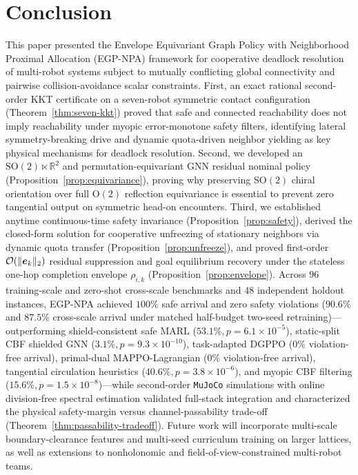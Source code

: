 \section{Conclusion}\label{sec:conclusion}

This paper presented the Envelope Equivariant Graph Policy with Neighborhood Proximal Allocation (EGP-NPA) framework for cooperative deadlock resolution of multi-robot systems subject to mutually conflicting global connectivity and pairwise collision-avoidance scalar constraints. First, an exact rational second-order KKT certificate on a seven-robot symmetric contact configuration (Theorem~\ref{thm:seven-kkt}) proved that safe and connected reachability does not imply reachability under myopic error-monotone safety filters, identifying lateral symmetry-breaking drive and dynamic quota-driven neighbor yielding as key physical mechanisms for deadlock resolution. Second, we developed an $\mathrm{SO}(2)\ltimes\mathbb R^2$ and permutation-equivariant GNN residual nominal policy (Proposition~\ref{prop:equivariance}), proving why preserving $\mathrm{SO}(2)$ chiral orientation over full $\mathrm{O}(2)$ reflection equivariance is essential to prevent zero tangential output on symmetric head-on encounters. Third, we established anytime continuous-time safety invariance (Proposition~\ref{prop:safety}), derived the closed-form solution for cooperative unfreezing of stationary neighbors via dynamic quota transfer (Proposition~\ref{prop:unfreeze}), and proved first-order $\mathcal O(\lVert\boldsymbol{e}_k\rVert_2)$ residual suppression and goal equilibrium recovery under the stateless one-hop completion envelope $\rho_{i,k}$ (Proposition~\ref{prop:envelope}). Across $96$ training-scale and zero-shot cross-scale benchmarks and $48$ independent holdout instances, EGP-NPA achieved $100\%$ safe arrival and zero safety violations ($90.6\%$ and $87.5\%$ cross-scale arrival under matched half-budget two-seed retraining)—outperforming shield-consistent safe MARL ($53.1\%,p=6.1\times 10^{-5}$), static-split CBF shielded GNN ($3.1\%,p=9.3\times 10^{-10}$), task-adapted DGPPO ($0\%$ violation-free arrival), primal-dual MAPPO-Lagrangian ($0\%$ violation-free arrival), tangential circulation heuristics ($40.6\%,p=3.8\times 10^{-6}$), and myopic CBF filtering ($15.6\%,p=1.5\times 10^{-8}$)—while second-order \texttt{MuJoCo} simulations with online division-free spectral estimation validated full-stack integration and characterized the physical safety-margin versus channel-passability trade-off (Theorem~\ref{thm:passability-tradeoff}). Future work will incorporate multi-scale boundary-clearance features and multi-seed curriculum training on larger lattices, as well as extensions to nonholonomic and field-of-view-constrained multi-robot teams.

